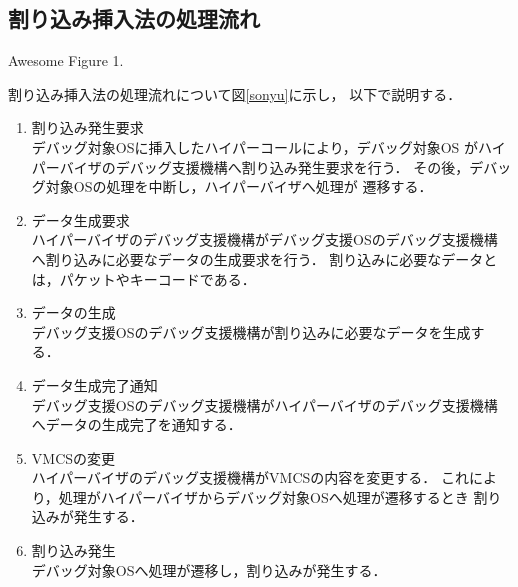 \documentclass[tanilab-enum]{graduate}
\begin{document}
    \subsection{割り込み挿入法の処理流れ}
    {Awesome Figure 1.}

    割り込み挿入法の処理流れについて図\ref{sonyu}に示し，
    以下で説明する．
    \begin{enumerate}
        \item 割り込み発生要求\\
            デバッグ対象OSに挿入したハイパーコールにより，デバッグ対象OS
            がハイパーバイザのデバッグ支援機構へ割り込み発生要求を行う．
            その後，デバッグ対象OSの処理を中断し，ハイパーバイザへ処理が
            遷移する．
        \item データ生成要求\\
            ハイパーバイザのデバッグ支援機構がデバッグ支援OSのデバッグ支援機構
            へ割り込みに必要なデータの生成要求を行う．
            割り込みに必要なデータとは，パケットやキーコードである．
        \item データの生成\\
            デバッグ支援OSのデバッグ支援機構が割り込みに必要なデータを生成する．
        \item データ生成完了通知\\
            デバッグ支援OSのデバッグ支援機構がハイパーバイザのデバッグ支援機構
            へデータの生成完了を通知する．
        \item VMCSの変更\\
            ハイパーバイザのデバッグ支援機構がVMCSの内容を変更する．
            これにより，処理がハイパーバイザからデバッグ対象OSへ処理が遷移するとき
            割り込みが発生する．
        \item 割り込み発生\\
            デバッグ対象OSへ処理が遷移し，割り込みが発生する．
    \end{enumerate}
\end{document}
